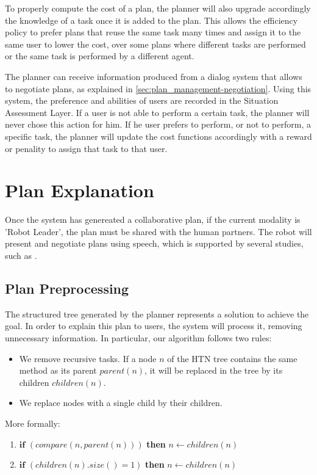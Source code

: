 To properly compute the cost of a plan, the planner will also upgrade accordingly the knowledge of a task once it is added to the plan. This allows the efficiency policy to prefer plans that reuse the same task many times and assign it to the same user to lower the cost, over some plans where different tasks are performed or the same task is performed by a different agent.

The planner can receive information produced from a dialog system that allows to negotiate plans, as explained in \ref{sec:plan_management-negotiation}. Using this system, the preference and abilities of users are recorded in the Situation Assessment Layer. 
If a user is not able to perform a certain task, the planner will never chose this action for him. If he user prefers to perform, or not to perform, a specific task, the planner will update the cost functions accordingly with a reward or penality to assign that task to that user.

\section{Plan Explanation}
\label{sec:plan_management-plan_explanation}
Once the system has genereated a collaborative plan, if the current modality is 'Robot Leader', the plan must be shared with the human partners. The robot will present and negotiate plans using speech, which is supported by several studies, such as \cite{Lalle2013,tomasello2005}.

\subsection{Plan Preprocessing}
The structured tree generated by the planner represents a solution to achieve the goal. In order to explain this plan to users, the system will process it, removing unnecessary information. In particular, our algorithm follows two rules:
\begin{itemize}
	\item  We remove recursive tasks. If a node $n$ of the HTN tree contains the same method as its parent $parent(n)$, it will be replaced in the tree by its children $children(n)$. 
	\item We replace nodes with a single child by their children.
\end{itemize}

More formally:
\begin{enumerate}
\item $\textbf{if}$ $(compare(n, parent(n)))$ \textbf{then} $n \leftarrow children(n)$
\item $\textbf{if}$ $(children(n).size() = 1)$ \textbf{then} $n \leftarrow children(n)$
\end{enumerate}

